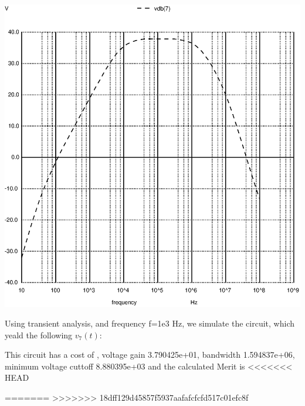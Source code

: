 \includegraphics[width=1\linewidth]{../sim/vo2f.ps}

\par

Using transient analysis, and frequency f=1e3 Hz, we simulate the circuit, which yeald the following $v_7(t)$:




This circuit has a cost of , voltage gain 3.790425e+01, bandwidth 1.594837e+06, minimum voltage cuttoff 8.880395e+03 and the  calculated Merit is 
<<<<<<< HEAD


=======
>>>>>>> 18dff129d45857f5937aafafcfcfd517c01efc8f
